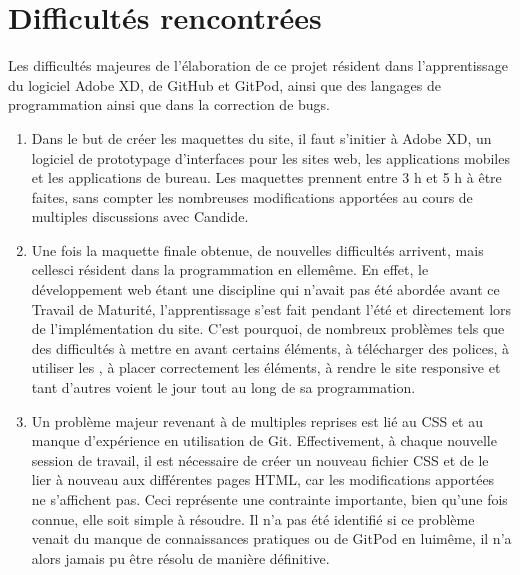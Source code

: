 \documentclass[a4,10pt,french]{sphinxmanual}
\begin{document}
\section{Difficultés rencontrées}
\label{\detokenize{chapitre-03:difficultes-rencontrees}}
\sphinxAtStartPar
Les difficultés majeures de l’élaboration de ce projet résident dans l’apprentissage du logiciel Adobe XD, de GitHub et GitPod, ainsi que des langages de programmation ainsi que dans la correction de bugs.
\begin{enumerate}
%
\item {} 
\sphinxAtStartPar
Dans le but de créer les maquettes du site, il faut s’initier à Adobe XD, un logiciel de prototypage d’interfaces pour les sites web, les applications mobiles et les applications de bureau. Les maquettes prennent entre 3 h et 5 h à être faites, sans compter les nombreuses modifications apportées au cours de multiples discussions avec Candide.

\item {} 
\sphinxAtStartPar
Une fois la maquette finale obtenue, de nouvelles difficultés arrivent, mais celles\sphinxhyphen{}ci résident dans la programmation en elle\sphinxhyphen{}même. En effet, le développement web étant une discipline qui n’avait pas été abordée avant ce Travail de Maturité, l’apprentissage s’est fait pendant l’été et directement lors de l’implémentation du site. C’est pourquoi, de nombreux problèmes tels que des difficultés à mettre en avant certains éléments, à télécharger des polices, à utiliser les , à placer correctement les éléments, à rendre le site responsive et tant d’autres voient le jour tout au long de sa programmation.

\item {} 
\sphinxAtStartPar
Un problème majeur revenant à de multiples reprises est lié au CSS et au manque d’expérience en utilisation de Git. Effectivement, à chaque nouvelle session de travail, il est nécessaire de créer un nouveau fichier CSS et de le lier à nouveau aux différentes pages HTML, car les modifications apportées ne s’affichent pas. Ceci représente une contrainte importante, bien qu’une fois connue, elle soit simple à résoudre.
Il n’a pas été identifié si ce problème venait du manque de connaissances pratiques ou de GitPod en lui\sphinxhyphen{}même, il n’a alors jamais pu être résolu de manière définitive.

\end{enumerate}
\end{document}
